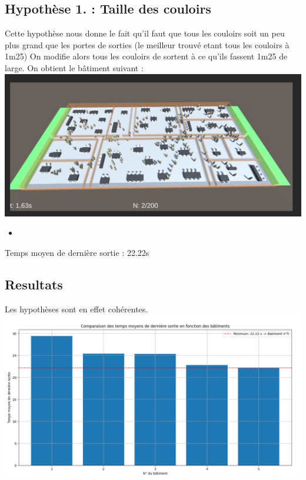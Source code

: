 \documentclass[12pt]{article}
\begin{document}
\subsection{Hypothèse 1. : Taille des couloirs}
Cette hypothèse nous donne le fait qu'il faut que tous les couloirs soit un peu plus grand que les portes de sorties
(le meilleur trouvé etant tous les couloirs à 1m25)
\newline\newline
On modifie alors tous les couloirs de sortent à ce qu'ils fassent 1m25 de large.
\newline\newline
On obtient le bâtiment suivant :
\newline
\includegraphics[scale=0.5]{Batiment Hypothèse 1..jpg}
\newline
\begin{itemize}
    \item
\end{itemize}
Temps moyen de dernière sortie : 22.22s
\subsection{Resultats}
Les hypothèses sont en effet cohérentes.
\newline
\includegraphics[scale=0.4]{Resultat - Hypothese.jpg}
\newline
\end{document}
